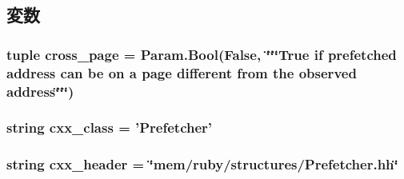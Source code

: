 \subsection{変数}
\hypertarget{classRubyPrefetcher_1_1Prefetcher_a40f230330015dac14646c169c21a4c9c}{
\subsubsection[{cross\_\-page}]{\setlength{\rightskip}{0pt plus 5cm}tuple {\bf cross\_\-page} = Param.Bool(False, \char`\"{}\char`\"{}\char`\"{}True if prefetched address can be on a page different from the observed address\char`\"{}\char`\"{}\char`\"{})}}
\label{classRubyPrefetcher_1_1Prefetcher_a40f230330015dac14646c169c21a4c9c}
\hypertarget{classRubyPrefetcher_1_1Prefetcher_a58cd55cd4023648e138237cfc0822ae3}{
\subsubsection[{cxx\_\-class}]{\setlength{\rightskip}{0pt plus 5cm}string {\bf cxx\_\-class} = '{\bf Prefetcher}'}}
\label{classRubyPrefetcher_1_1Prefetcher_a58cd55cd4023648e138237cfc0822ae3}
\hypertarget{classRubyPrefetcher_1_1Prefetcher_a17da7064bc5c518791f0c891eff05fda}{
\subsubsection[{cxx\_\-header}]{\setlength{\rightskip}{0pt plus 5cm}string {\bf cxx\_\-header} = \char`\"{}mem/ruby/structures/Prefetcher.hh\char`\"{}}}
\label{classRubyPrefetcher_1_1Prefetcher_a17da7064bc5c518791f0c891eff05fda}


